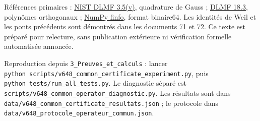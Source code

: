 \documentclass[
  10pt,
  a4paper,
]{article}
\begin{document}
Références primaires : \href{https://dlmf.nist.gov/3.5\#v}{NIST DLMF
3.5(v)}, quadrature de Gauss ; \href{https://dlmf.nist.gov/18.3}{DLMF
18.3}, polynômes orthogonaux ;
\href{https://numpy.org/doc/stable/reference/generated/numpy.finfo.html}{NumPy
finfo}, format binaire64. Les identités de Weil et les ponts précédents
sont démontrés dans les documents 71 et 72. Ce texte est préparé pour
relecture, sans publication extérieure ni vérification formelle
automatisée annoncée.

Reproduction depuis \texttt{3\_Preuves\_et\_calculs} : lancer
\texttt{python\ scripts/v648\_common\_certificate\_experiment.py}, puis
\texttt{python\ tests/run\_all\_tests.py}. Le diagnostic séparé est
\texttt{scripts/v648\_common\_operator\_diagnostic.py}. Les résultats
sont dans \texttt{data/v648\_common\_certificate\_resultats.json} ; le
protocole dans \texttt{data/v648\_protocole\_operateur\_commun.json}.
\end{document}
